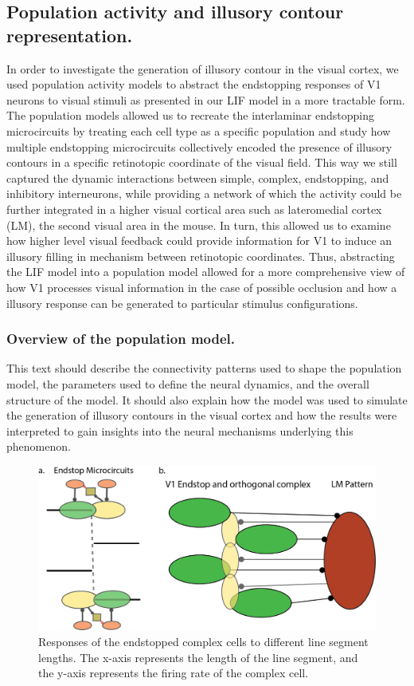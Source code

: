 \documentclass[12pt]{article}
\begin{document}
\subsection{Population activity and illusory contour representation.}
In order to investigate the generation of illusory contour in the visual cortex, we used population activity models to abstract the endstopping responses of V1 neurons to visual stimuli as presented in our LIF model in a more tractable form. The population models allowed us to recreate the interlaminar endstopping microcircuits by treating each cell type as a specific population and study how multiple endstopping microcircuits collectively encoded the presence of illusory contours in a specific retinotopic coordinate of the visual field. This way we still captured the dynamic interactions between simple, complex, endstopping, and inhibitory interneurons, while providing a network of which the activity could be further integrated in a higher visual cortical area such as lateromedial cortex (LM), the second visual area in the mouse. In turn, this allowed us to examine how higher level visual feedback could provide information for V1 to induce an illusory filling in mechanism between retinotopic coordinates. Thus, abstracting the LIF model into a population model allowed for a more comprehensive view of how V1 processes visual information in the case of possible occlusion and how a illusory response can be generated to particular stimulus configurations.

\subsubsection{Overview of the population model.}
This text should describe the connectivity patterns used to shape the population model, the parameters used to define the neural dynamics, and the overall structure of the model. It should also explain how the model was used to simulate the generation of illusory contours in the visual cortex and how the results were interpreted to gain insights into the neural mechanisms underlying this phenomenon.

\begin{figure}[H]
  \centering
  \includegraphics[width=1 \textwidth]{./figures/illusory_filling.png}
  \caption{Responses of the endstopped complex cells to different line segment lengths. The x-axis represents the length of the line segment, and the y-axis represents the firing rate of the complex cell.}
  \label{fig:illusory_filling}
\end{figure}
\end{document}
